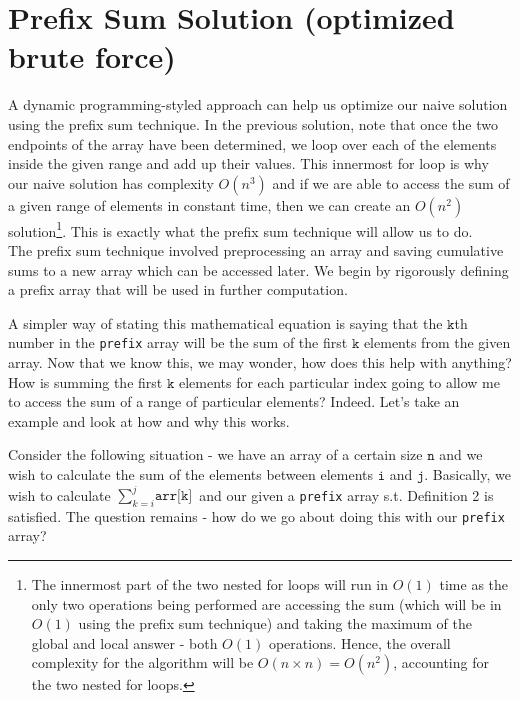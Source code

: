 
\section{Prefix Sum Solution (optimized brute force)}
A dynamic programming-styled approach can help us optimize our naive solution using the prefix sum technique. In the previous solution, note that once the two endpoints of the array have been determined, we loop over each of the elements inside the given range and add up their values. This innermost for loop is why our naive solution has complexity $O(n^3)$ and if we are able to access the sum of a given range of elements in constant time, then we can create an $O(n^2)$ solution\footnote{The innermost part of the two nested for loops will run in $O(1)$ time as the only two operations being performed are accessing the sum (which will be in $O(1)$ using the prefix sum technique) and taking the maximum of the global and local answer - both $O(1)$ operations. Hence, the overall complexity for the algorithm will be $O(n \times n) = O(n^2)$, accounting for the two nested for loops.}. This is exactly what the prefix sum technique will allow us to do. \\

\noindent The prefix sum technique involved preprocessing an array and saving cumulative sums to a new array which can be accessed later. We begin by rigorously defining a prefix array that will be used in further computation.  

\noindent \newline {}

\noindent \newline A simpler way of stating this mathematical equation is saying that the $\texttt{k}$th number in the \texttt{prefix} array will be the sum of the first $\texttt{k}$ elements from the given array. Now that we know this, we may wonder, how does this help with anything? How is summing the first $\texttt{k}$ elements for each particular index going to allow me to access the sum of a range of particular elements? Indeed. Let's take an example and look at how and why this works. \newline

\noindent Consider the following situation - we have an array of a certain size $\texttt{n}$ and we wish to calculate the sum of the elements between elements $\texttt{i}$ and $\texttt{j}$. Basically, we wish to calculate  $\sum_{k=i}^j \texttt{arr[k]}$ \noindent and our given a \texttt{prefix} array s.t. Definition 2 is satisfied. The question remains - how do we go about doing this with our \texttt{prefix} array?

